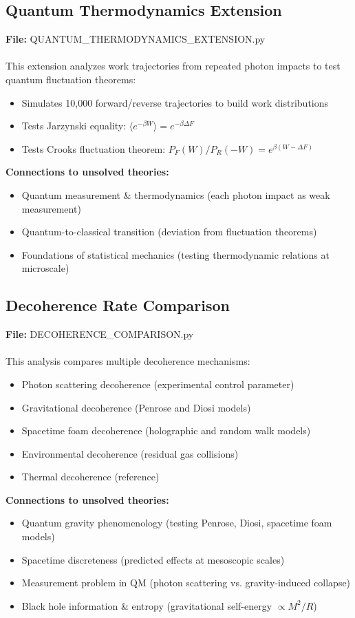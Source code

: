 \documentclass[11pt]{article}
\begin{document}
\subsection{Quantum Thermodynamics Extension}
\textbf{File:} QUANTUM\_THERMODYNAMICS\_EXTENSION.py
\\\\
This extension analyzes work trajectories from repeated photon impacts to test quantum fluctuation theorems:
\begin{itemize}
\item Simulates 10,000 forward/reverse trajectories to build work distributions
\item Tests Jarzynski equality: $\langle e^{-\beta W} \rangle = e^{-\beta \Delta F}$
\item Tests Crooks fluctuation theorem: $P_F(W)/P_R(-W) = e^{\beta(W-\Delta F)}$
\end{itemize}
\textbf{Connections to unsolved theories:}
\begin{itemize}
\item Quantum measurement \& thermodynamics (each photon impact as weak measurement)
\item Quantum-to-classical transition (deviation from fluctuation theorems)
\item Foundations of statistical mechanics (testing thermodynamic relations at microscale)
\end{itemize}

\subsection{Decoherence Rate Comparison}
\textbf{File:} DECOHERENCE\_COMPARISON.py
\\\\
This analysis compares multiple decoherence mechanisms:
\begin{itemize}
\item Photon scattering decoherence (experimental control parameter)
\item Gravitational decoherence (Penrose and Diosi models)
\item Spacetime foam decoherence (holographic and random walk models)
\item Environmental decoherence (residual gas collisions)
\item Thermal decoherence (reference)
\end{itemize}
\textbf{Connections to unsolved theories:}
\begin{itemize}
\item Quantum gravity phenomenology (testing Penrose, Diosi, spacetime foam models)
\item Spacetime discreteness (predicted effects at mesoscopic scales)
\item Measurement problem in QM (photon scattering vs. gravity-induced collapse)
\item Black hole information \& entropy (gravitational self-energy $\propto M^2/R$)
\end{itemize}
\end{document}
